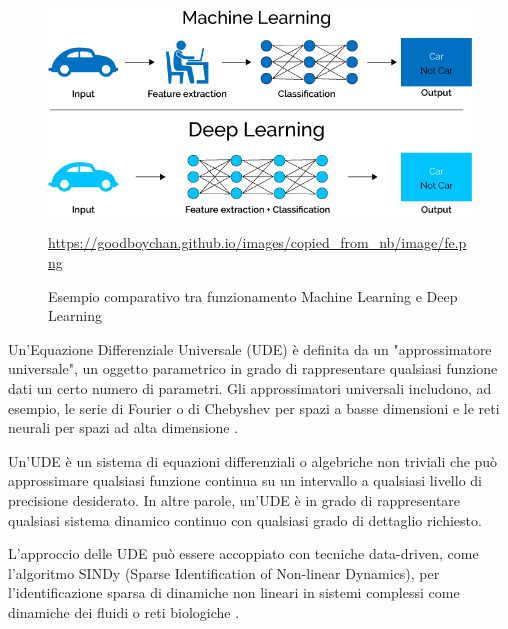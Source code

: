 \begin{figure}[H]
    \begin{center}
        \includegraphics[scale=0.4]{img/Caratteristiche-e-funzionamento-del-Deep-Learning-in-informatica.png}
        \caption{Esempio comparativo tra funzionamento Machine Learning e Deep Learning}
        \url{https://goodboychan.github.io/images/copied_from_nb/image/fe.png}
        \label{fig:ml_dl_example}
    \end{center}
\end{figure}

Un'Equazione Differenziale Universale (UDE) è definita da un 
"approssimatore universale", un oggetto parametrico in grado di 
rappresentare qualsiasi funzione dati un certo numero di parametri. 
Gli approssimatori universali includono, ad esempio, le serie di Fourier 
o di Chebyshev per spazi a basse dimensioni e le reti neurali per spazi 
ad alta dimensione \cite{rackauckas2020universal}.

Un'UDE è un sistema di equazioni differenziali o algebriche non triviali 
che può approssimare qualsiasi funzione continua su un intervallo a 
qualsiasi livello di precisione desiderato. In altre parole, un'UDE è 
in grado di rappresentare qualsiasi sistema dinamico continuo con 
qualsiasi grado di dettaglio richiesto.

L'approccio delle UDE può essere accoppiato con tecniche data-driven, 
come l'algoritmo SINDy (Sparse Identification of Non-linear Dynamics), 
per l'identificazione sparsa di dinamiche non lineari in sistemi 
complessi come dinamiche dei fluidi o reti biologiche \cite{datadrivendiffeq}.

